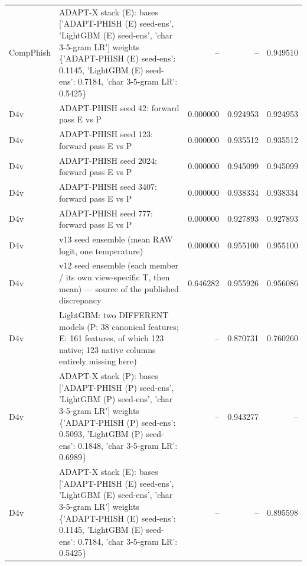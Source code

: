 \begin{table}[t]
\begin{tabular}{llrrr}
CompPhish & ADAPT-X stack (E): bases ['ADAPT-PHISH (E) seed-ens', 'LightGBM (E) seed-ens', 'char 3-5-gram LR'] weights \{'ADAPT-PHISH (E) seed-ens': 0.1145, 'LightGBM (E) seed-ens': 0.7184, 'char 3-5-gram LR': 0.5425\} & -- & -- & 0.949510 \\
D4v & ADAPT-PHISH seed 42: forward pass E vs P & 0.000000 & 0.924953 & 0.924953 \\
D4v & ADAPT-PHISH seed 123: forward pass E vs P & 0.000000 & 0.935512 & 0.935512 \\
D4v & ADAPT-PHISH seed 2024: forward pass E vs P & 0.000000 & 0.945099 & 0.945099 \\
D4v & ADAPT-PHISH seed 3407: forward pass E vs P & 0.000000 & 0.938334 & 0.938334 \\
D4v & ADAPT-PHISH seed 777: forward pass E vs P & 0.000000 & 0.927893 & 0.927893 \\
D4v & v13 seed ensemble (mean RAW logit, one temperature) & 0.000000 & 0.955100 & 0.955100 \\
D4v & v12 seed ensemble (each member / its own view-specific T, then mean) — source of the published discrepancy & 0.646282 & 0.955926 & 0.956086 \\
D4v & LightGBM: two DIFFERENT models (P: 38 canonical features; E: 161 features, of which 123 native; 123 native columns entirely missing here) & -- & 0.870731 & 0.760260 \\
D4v & ADAPT-X stack (P): bases ['ADAPT-PHISH (P) seed-ens', 'LightGBM (P) seed-ens', 'char 3-5-gram LR'] weights \{'ADAPT-PHISH (P) seed-ens': 0.5093, 'LightGBM (P) seed-ens': 0.1848, 'char 3-5-gram LR': 0.6989\} & -- & 0.943277 & -- \\
D4v & ADAPT-X stack (E): bases ['ADAPT-PHISH (E) seed-ens', 'LightGBM (E) seed-ens', 'char 3-5-gram LR'] weights \{'ADAPT-PHISH (E) seed-ens': 0.1145, 'LightGBM (E) seed-ens': 0.7184, 'char 3-5-gram LR': 0.5425\} & -- & -- & 0.895598 \\
\bottomrule
\end{tabular}
\end{table}